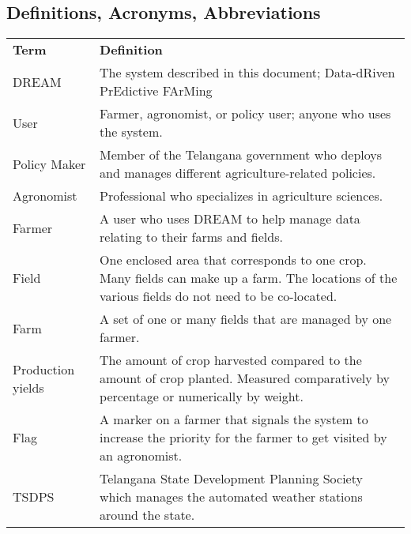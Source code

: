 \subsection{Definitions, Acronyms, Abbreviations}
\begin{center}
\renewcommand{\arraystretch}{1.25}
\begin{tabular}{l >{\raggedright\arraybackslash}p{12cm} } \hline
    \textbf{Term} & \textbf{Definition}\\ 
    DREAM & The system described in this document; Data-dRiven PrEdictive FArMing\\
    User & Farmer, agronomist, or policy user; anyone who uses the system.\\
	Policy Maker & Member of the Telangana government who deploys and manages different agriculture-related policies. \\
	Agronomist & Professional who specializes in agriculture sciences. \\
    Farmer & A user who uses DREAM to help manage data relating to their farms and fields.\\
    Field & One enclosed area that corresponds to one crop. Many fields can make up a farm. The locations of the various fields do not need to be co-located.\\
    Farm & A set of one or many fields that are managed by one farmer.\\
    Production yields & The amount of crop harvested compared to the amount of crop planted. Measured comparatively by percentage or numerically by weight.\\
    Flag & A marker on a farmer that signals the system to increase the priority for the farmer to get visited by an agronomist.\\
    TSDPS & Telangana State Development Planning Society which manages the automated weather stations around the state. \\
\end{tabular}
\end{center}

